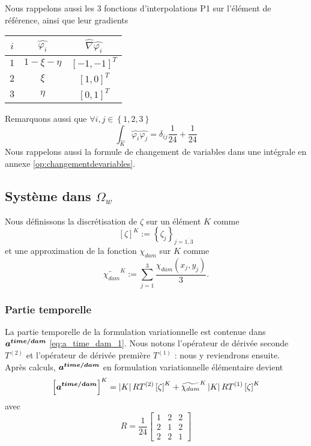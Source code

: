 Nous rappelons aussi les 3 fonctions d'interpolations P1 sur l'élément de référence, ainsi que leur gradients
\begin{center}
\begingroup
\setlength{\tabcolsep}{10pt} %
\renewcommand{\arraystretch}{1.5} %
\begin{tabular}{|c|c|c|}
	\hline
	$i$ & $\widehat{\varphi_i}$ & $\widehat{\nabla} \widehat{\varphi_i}$\\
	\hline
	$1$ & $1-\xi-\eta$ & $\left[-1, -1\right]^{T}$\\
	$2$ & $\xi$ & $\left[1, 0\right]^{T}$\\
	$3$ & $\eta$ & $\left[0, 1\right]^{T}$\\
	\hline	
\end{tabular}
\endgroup
\end{center}

\noindent Remarquons aussi que $\forall i, j \in \left\{1, 2, 3\right\}$
\begin{equation}
\int_{\widehat{K}}\widehat{\varphi_i}\widehat{\varphi_j} = \delta_{ij}\frac{1}{24} + \frac{1}{24}\label{eq:integrale_phiij}
\end{equation}
Nous rappelons aussi la formule de changement de variables dans une intégrale en annexe \eqref{op:changementdevariables}.

\subsection{Système dans $\Omega_w$}
\noindent Nous définissons la discrétisation de $\zeta$ sur un élément $K$ comme 
\begin{equation}
	\left[\zeta\right]^{K} := \left\{\zeta_j\right\}_{j=\overline{1, 3}}
\end{equation}
et une approximation de la fonction $\chi_{dam}$ sur $K$ comme
\begin{equation}
	\widetilde{\chi_{dam}}^{K} := \sum_{j=1}^{3}\frac{\chi_{dam} (x_j, y_j)}{3}.
\end{equation}

\subsubsection{Partie temporelle}
\noindent La partie temporelle de la formulation variationnelle est contenue dans $\boldsymbol{a^{time/dam}}$ \eqref{eq:a_time_dam_1}. Nous notons l'opérateur de dérivée seconde $T^{(2)}$ et l'opérateur de dérivée première $T^{(1)}$ : nous y reviendrons ensuite.\\
Après calculs, $\boldsymbol{a^{time/dam}}$ en formulation variationnelle élémentaire devient
\begin{equation}
	\left[\boldsymbol{a^{time/dam}}\right]^{K} = \left|K\right|R T^{(2)} \left[\zeta\right]^{K} + \widetilde{\chi_{dam}}^{K}\left|K\right| R T^{(1)} \left[\zeta\right]^{K}
\end{equation}
avec
\begin{equation}
R = \frac{1}{24}\begin{bmatrix}
1 & 2 & 2\\
2 & 1 & 2\\
2 & 2 & 1
\end{bmatrix}
\end{equation}
